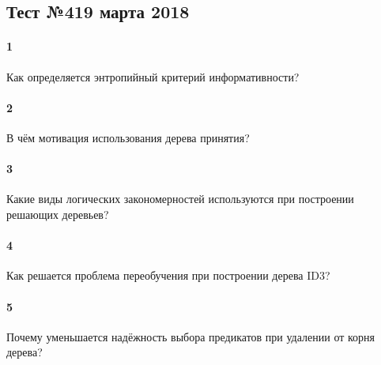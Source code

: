 \documentclass[a4paper,12pt]{article}
\begin{document}
  \subsection*{Тест №4\hfill{19 марта 2018}}

  \paragraph{1} Как определяется энтропийный критерий информативности?
  
  \makebox[\linewidth]{\hrulefill}
  \makebox[\linewidth]{\hrulefill}
  
  \paragraph{2} В чём мотивация использования дерева принятия?

  \makebox[\linewidth]{\hrulefill}
  \makebox[\linewidth]{\hrulefill}
  \makebox[\linewidth]{\hrulefill}
  \makebox[\linewidth]{\hrulefill}

  \paragraph{3} Какие виды логических закономерностей используются при построении решающих деревьев?

  \makebox[\linewidth]{\hrulefill}
  \makebox[\linewidth]{\hrulefill}
  \makebox[\linewidth]{\hrulefill}
  \makebox[\linewidth]{\hrulefill}

  \paragraph{4} Как решается проблема переобучения при построении дерева ID3?

  \makebox[\linewidth]{\hrulefill}
  \makebox[\linewidth]{\hrulefill}
  \makebox[\linewidth]{\hrulefill}
  \makebox[\linewidth]{\hrulefill}

  \paragraph{5} Почему уменьшается надёжность выбора предикатов при удалении от корня дерева?

  \makebox[\linewidth]{\hrulefill}
  \makebox[\linewidth]{\hrulefill}
  \makebox[\linewidth]{\hrulefill}
  \makebox[\linewidth]{\hrulefill}
  
\end{document}
